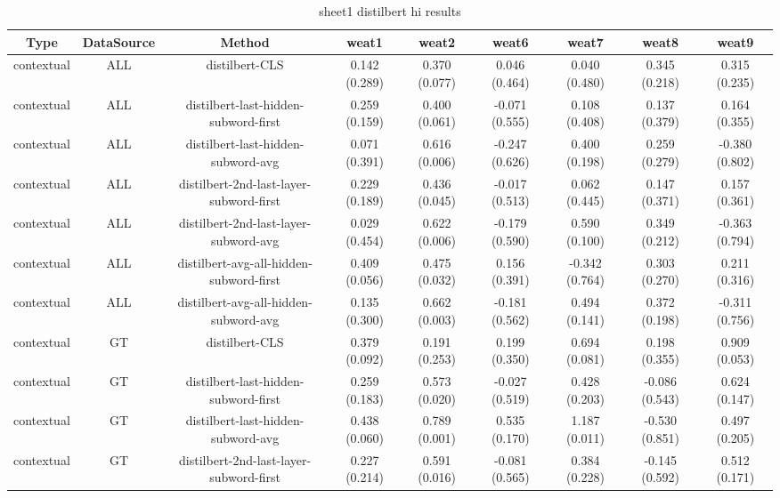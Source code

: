 \begin{sidewaystable}[htb]
    \centering
    \caption{sheet1 distilbert hi results}
    \label{appendix_tab:sheet1_distilbert_hi_results}
    \small
    \begin{tabular}{@{}ccccccccc@{}}
        \toprule
        Type & DataSource & Method & weat1 & weat2 & weat6 & weat7 & weat8 & weat9 \\
        \midrule
        contextual & ALL & distilbert-CLS & 0.142 (0.289) & 0.370 (0.077) & 0.046 (0.464) & 0.040 (0.480) & 0.345 (0.218) & 0.315 (0.235) \\
        contextual & ALL & distilbert-last-hidden-subword-first & 0.259 (0.159) & 0.400 (0.061) & -0.071 (0.555) & 0.108 (0.408) & 0.137 (0.379) & 0.164 (0.355) \\
        contextual & ALL & distilbert-last-hidden-subword-avg & 0.071 (0.391) & 0.616 (0.006) & -0.247 (0.626) & 0.400 (0.198) & 0.259 (0.279) & -0.380 (0.802) \\
        contextual & ALL & distilbert-2nd-last-layer-subword-first & 0.229 (0.189) & 0.436 (0.045) & -0.017 (0.513) & 0.062 (0.445) & 0.147 (0.371) & 0.157 (0.361) \\
        contextual & ALL & distilbert-2nd-last-layer-subword-avg & 0.029 (0.454) & 0.622 (0.006) & -0.179 (0.590) & 0.590 (0.100) & 0.349 (0.212) & -0.363 (0.794) \\
        contextual & ALL & distilbert-avg-all-hidden-subword-first & 0.409 (0.056) & 0.475 (0.032) & 0.156 (0.391) & -0.342 (0.764) & 0.303 (0.270) & 0.211 (0.316) \\
        contextual & ALL & distilbert-avg-all-hidden-subword-avg & 0.135 (0.300) & 0.662 (0.003) & -0.181 (0.562) & 0.494 (0.141) & 0.372 (0.198) & -0.311 (0.756) \\
        contextual & GT & distilbert-CLS & 0.379 (0.092) & 0.191 (0.253) & 0.199 (0.350) & 0.694 (0.081) & 0.198 (0.355) & 0.909 (0.053) \\
        contextual & GT & distilbert-last-hidden-subword-first & 0.259 (0.183) & 0.573 (0.020) & -0.027 (0.519) & 0.428 (0.203) & -0.086 (0.543) & 0.624 (0.147) \\
        contextual & GT & distilbert-last-hidden-subword-avg & 0.438 (0.060) & 0.789 (0.001) & 0.535 (0.170) & 1.187 (0.011) & -0.530 (0.851) & 0.497 (0.205) \\
        contextual & GT & distilbert-2nd-last-layer-subword-first & 0.227 (0.214) & 0.591 (0.016) & -0.081 (0.565) & 0.384 (0.228) & -0.145 (0.592) & 0.512 (0.171) \\

\end{tabular}
\end{sidewaystable}

